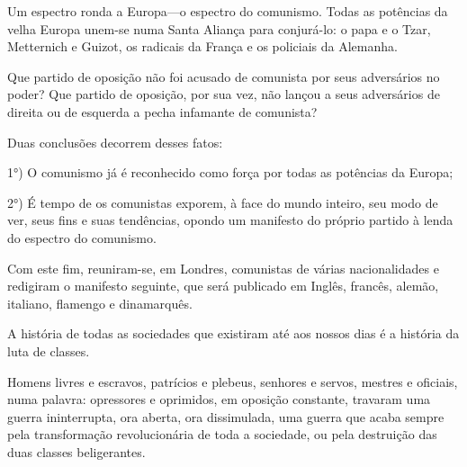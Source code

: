 \alinhaversocentro{}
\alinhanormal


Um espectro ronda a Europa---o espectro do comunismo. Todas as
potências da velha Europa unem-se numa Santa Aliança para conjurá-lo:
o papa e o Tzar, Metternich e Guizot, os radicais da França e os
policiais da Alemanha.

Que partido de oposição não foi acusado de comunista por seus
adversários no poder? Que partido de oposição, por sua vez, não lançou
a seus adversários de direita ou de esquerda a pecha infamante de
comunista?

Duas conclusões decorrem desses fatos:

1°) O comunismo já é reconhecido como força por todas as potências da
Europa;

2°) É tempo de os comunistas exporem, à face do mundo inteiro, seu
modo de ver, seus fins e suas tendências, opondo um manifesto do
próprio partido à lenda do
espectro do comunismo.

Com este fim, reuniram-se, em Londres, comunistas de várias
nacionalidades e redigiram o manifesto seguinte, que será publicado em
Inglês, francês, alemão, italiano, flamengo e dinamarquês.




A história de todas as sociedades que existiram até aos nossos
dias é a história da luta de classes.

Homens livres e escravos, patrícios e plebeus, senhores e servos,
mestres e oficiais, numa palavra: opressores e oprimidos, em oposição
constante, travaram uma guerra ininterrupta, ora aberta, ora
dissimulada, uma guerra que acaba sempre pela transformação
revolucionária de toda a sociedade, ou pela destruição das duas
classes beligerantes.

